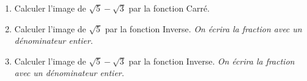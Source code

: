 
\begin{enumerate}
\item Calculer l'image de $\sqrt{5}-\sqrt{3}$ par la fonction Carré.
\item  Calculer l'image de $\sqrt{5}$ par la fonction Inverse. \textit{On écrira la fraction avec un dénominateur
entier.}
\item  Calculer l'image de $\sqrt{5}-\sqrt{3}$ par la fonction Inverse. \textit{On écrira la fraction avec un
dénominateur entier.}
\end{enumerate}